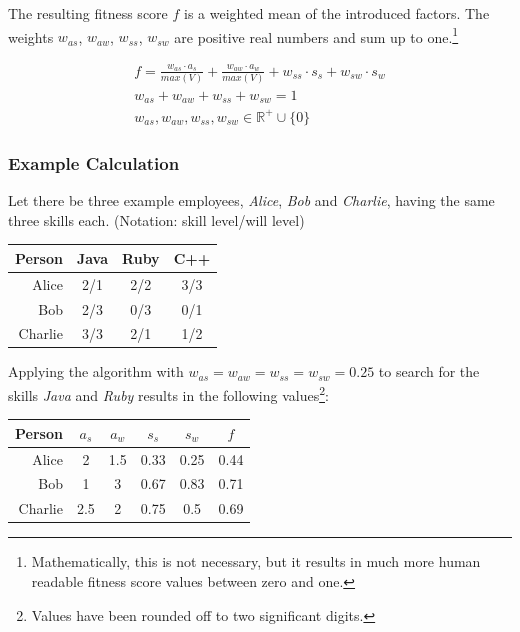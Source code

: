 The resulting fitness score $f$ is a weighted mean of the introduced factors. The weights $w_{as}$, $w_{aw}$, $w_{ss}$, $w_{sw}$ are positive real numbers and sum up to one.\footnote{Mathematically, this is not necessary, but it results in much more human readable fitness score values between zero and one.}

\begin{gather*}
  f = \frac{w_{as} \cdot a_s}{max(V)} + \frac{w_{aw} \cdot a_w}{ max(V)} + w_{ss} \cdot s_s + w_{sw} \cdot s_w \\
  w_{as} + w_{aw} + w_{ss} + w_{sw} = 1 \\
  w_{as}, w_{aw}, w_{ss}, w_{sw} \in \mathbb{R}^{+} \cup \{0\}
\end{gather*}

\newpage

\subsubsection{Example Calculation}
Let there be three example employees, \textit{Alice}, \textit{Bob} and \textit{Charlie}, having the same three skills each.
(Notation: skill level/will level)
\label{example-fitness}
\newline
\newline
\begin{center}
\begin{tabular}{r|ccc}
  Person  & Java & Ruby & C++ \\
  \hline
  Alice   & 2/1  & 2/2 & 3/3 \\
  Bob     & 2/3  & 0/3 & 0/1 \\
  Charlie & 3/3  & 2/1 & 1/2 \\
\end{tabular}
\end{center}

Applying the algorithm with $w_{as} = w_{aw} = w_{ss} = w_{sw} = 0.25$ to search for the skills \textit{Java} and \textit{Ruby} results in the following values\footnote{Values have been rounded off to two significant digits.}:


\begin{center}
\begin{tabular}{r|cccc|c}
  Person  & $a_s$ & $a_w$ & $s_s$ & $s_w$ & $f$\\
  \hline
  Alice   & 2   & 1.5 & 0.33 & 0.25 & 0.44\\
  Bob     & 1   & 3   & 0.67 & 0.83 & 0.71\\
  Charlie & 2.5 & 2   & 0.75 & 0.5  & 0.69\\
\end{tabular}
\end{center}

